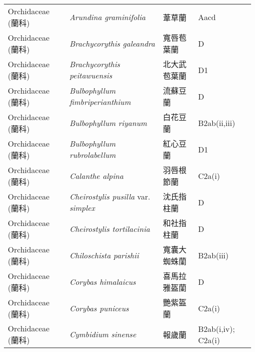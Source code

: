 \begin{longtable}{p{3cm}p{5cm}p{3cm}p{4cm}}
    Orchidaceae (蘭科) & \textit{Arundina graminifolia}  & 葦草蘭 & Aacd \index{Arundina@\textit{Arundina}!graminifolia@\textit{graminifolia}}  \index{葦草蘭} \\
    Orchidaceae (蘭科) & \textit{Brachycorythis galeandra}  & 寬唇苞葉蘭 & D \index{Brachycorythis@\textit{Brachycorythis}!galeandra@\textit{galeandra}}  \index{寬唇苞葉蘭} \\
    Orchidaceae (蘭科) & \textit{Brachycorythis peitawuensis}  & 北大武苞葉蘭 & D1 \index{Brachycorythis@\textit{Brachycorythis}!peitawuensis@\textit{peitawuensis}}  \index{北大武苞葉蘭} \\
    Orchidaceae (蘭科) & \textit{Bulbophyllum fimbriperianthium}  & 流蘇豆蘭 & D \index{Bulbophyllum@\textit{Bulbophyllum}!fimbriperianthium@\textit{fimbriperianthium}}  \index{流蘇豆蘭} \\
    Orchidaceae (蘭科) & \textit{Bulbophyllum riyanum}  & 白花豆蘭 & B2ab(ii,iii) \index{Bulbophyllum@\textit{Bulbophyllum}!riyanum@\textit{riyanum}}  \index{白花豆蘭} \\
    Orchidaceae (蘭科) & \textit{Bulbophyllum rubrolabellum}  & 紅心豆蘭 & D1 \index{Bulbophyllum@\textit{Bulbophyllum}!rubrolabellum@\textit{rubrolabellum}}  \index{紅心豆蘭} \\
    Orchidaceae (蘭科) & \textit{Calanthe alpina}  & 羽唇根節蘭 & C2a(i) \index{Calanthe@\textit{Calanthe}!alpina@\textit{alpina}}  \index{羽唇根節蘭} \\
    Orchidaceae (蘭科) & \textit{Cheirostylis pusilla} var. \textit{simplex}  & 沈氏指柱蘭 & D \index{Cheirostylis@\textit{Cheirostylis}!pusilla@\textit{pusilla}!var. simplex@var. \textit{simplex}}  \index{沈氏指柱蘭} \\
    Orchidaceae (蘭科) & \textit{Cheirostylis tortilacinia}  & 和社指柱蘭 & D \index{Cheirostylis@\textit{Cheirostylis}!tortilacinia@\textit{tortilacinia}}  \index{和社指柱蘭} \\
    Orchidaceae (蘭科) & \textit{Chiloschista parishii}  & 寬囊大蜘蛛蘭 & B2ab(iii) \index{Chiloschista@\textit{Chiloschista}!parishii@\textit{parishii}}  \index{寬囊大蜘蛛蘭} \\
    Orchidaceae (蘭科) & \textit{Corybas himalaicus}  & 喜馬拉雅盔蘭 & D \index{Corybas@\textit{Corybas}!himalaicus@\textit{himalaicus}}  \index{喜馬拉雅盔蘭} \\
    Orchidaceae (蘭科) & \textit{Corybas puniceus}  & 艷紫盔蘭 & C2a(i) \index{Corybas@\textit{Corybas}!puniceus@\textit{puniceus}}  \index{艷紫盔蘭} \\
    Orchidaceae (蘭科) & \textit{Cymbidium sinense}  & 報歲蘭 & B2ab(i,iv); C2a(i) \index{Cymbidium@\textit{Cymbidium}!sinense@\textit{sinense}}  \index{報歲蘭} \\

\end{longtable}
